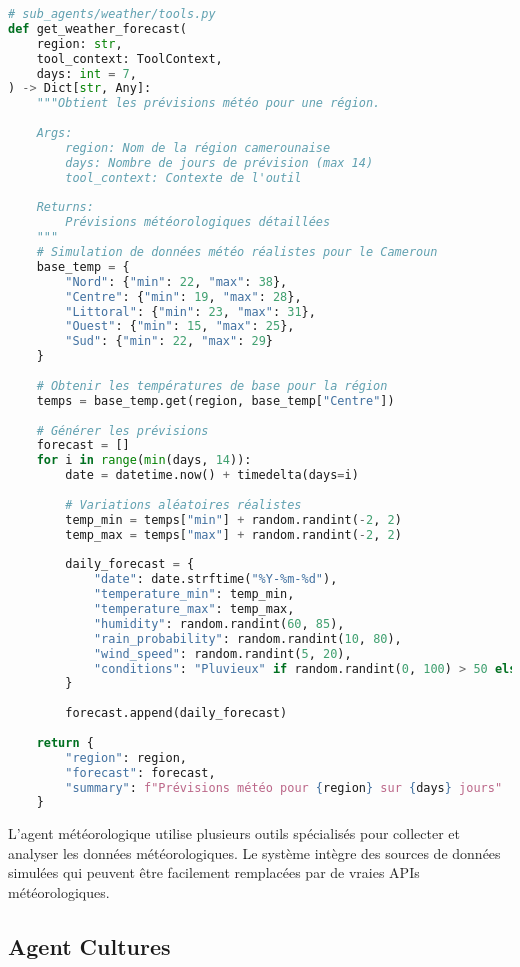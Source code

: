  
\begin{lstlisting}[language=Python, caption=Outils météorologiques]
# sub_agents/weather/tools.py
def get_weather_forecast(
    region: str,
    tool_context: ToolContext,
    days: int = 7,
) -> Dict[str, Any]:
    """Obtient les prévisions météo pour une région.
    
    Args:
        region: Nom de la région camerounaise
        days: Nombre de jours de prévision (max 14)
        tool_context: Contexte de l'outil
        
    Returns:
        Prévisions météorologiques détaillées
    """
    # Simulation de données météo réalistes pour le Cameroun
    base_temp = {
        "Nord": {"min": 22, "max": 38},
        "Centre": {"min": 19, "max": 28},
        "Littoral": {"min": 23, "max": 31},
        "Ouest": {"min": 15, "max": 25},
        "Sud": {"min": 22, "max": 29}
    }
    
    # Obtenir les températures de base pour la région
    temps = base_temp.get(region, base_temp["Centre"])
    
    # Générer les prévisions
    forecast = []
    for i in range(min(days, 14)):
        date = datetime.now() + timedelta(days=i)
        
        # Variations aléatoires réalistes
        temp_min = temps["min"] + random.randint(-2, 2)
        temp_max = temps["max"] + random.randint(-2, 2)
        
        daily_forecast = {
            "date": date.strftime("%Y-%m-%d"),
            "temperature_min": temp_min,
            "temperature_max": temp_max,
            "humidity": random.randint(60, 85),
            "rain_probability": random.randint(10, 80),
            "wind_speed": random.randint(5, 20),
            "conditions": "Pluvieux" if random.randint(0, 100) > 50 else "Partiellement nuageux"
        }
        
        forecast.append(daily_forecast)
    
    return {
        "region": region,
        "forecast": forecast,
        "summary": f"Prévisions météo pour {region} sur {days} jours"
    }
\end{lstlisting}

L'agent météorologique utilise plusieurs outils spécialisés pour collecter et analyser les données météorologiques. Le système intègre des sources de données simulées qui peuvent être facilement remplacées par de vraies APIs météorologiques.

\subsection{Agent Cultures}


